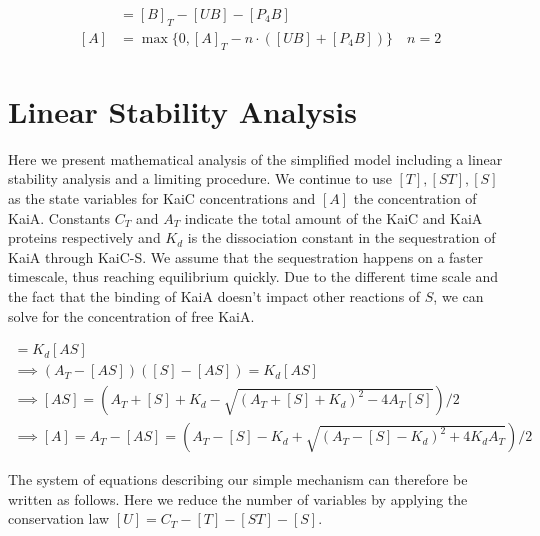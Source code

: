 \documentclass[a4paper,10pt]{article}
\numberwithin{equation}{section}
\begin{document}
\begin{align*}
[B]&=[B]_{T}-[UB]-[P_{4}B]\\
[A]&=\max\{0,[A]_{T}-n\cdot \left([UB]+[P_{4}B]\right) \}\quad n=2
\end{align*}




\section{Linear Stability Analysis}
Here we present mathematical analysis of the simplified model including a linear stability analysis and a limiting procedure. 
We continue to use $[T], [ST], [S]$ as the state variables for KaiC concentrations and $[A]$ the concentration of KaiA. Constants $C_T$ and $A_T$ indicate the total amount of the KaiC and KaiA proteins respectively and $K_d$ is the dissociation constant in the sequestration of KaiA through KaiC-S. We assume that the sequestration happens on a faster timescale, thus reaching equilibrium quickly. Due to the different time scale and the fact that the binding of KaiA doesn't impact other reactions of $S$, we can solve for the concentration of free KaiA.

\begin{gather*}
[A][S_{\mathrm{free}}]=K_d[AS]\\
\implies (A_T-[AS])([S]-[AS])=K_d[AS]\\
\implies 
[AS]=\left(A_T+[S]+K_d-\sqrt{(A_T+[S]+K_d)^2-4A_T[S]}\right)/2\\
\implies 
[A]=A_T-[AS]=\left(A_T-[S]-K_d+\sqrt{(A_T-[S]-K_d)^2+4K_dA_T}\right)/2
\end{gather*}


The system of equations describing our simple mechanism can therefore be written as follows.  Here we reduce the number of variables by applying the conservation law $[U]=C_T-[T]-[ST]-[S]$.  
\end{document}

